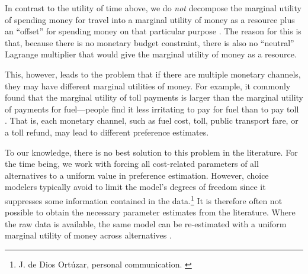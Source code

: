 In contrast to the utility of time above, we do \emph{not} decompose the  marginal utility of spending money for travel into a marginal utility of money as a resource plus an ``offset'' for spending money on that particular purpose \citep[for an example of this decomposition, see, e.g.][]{MunizagaEtAl2012TimeAllocationModeChoice}.  The reason for this is that, because there is no monetary budget constraint, there is also no ``neutral'' Lagrange multiplier that would give the marginal utility of money as a resource.

This, however, leads to the problem that if there are multiple monetary channels, they may have different marginal utilities of money.  For example, it commonly found that the marginal utility of toll payments is larger than the marginal utility of payments for fuel---\ie people find it less irritating to pay for fuel than to pay toll 
%
%
\citep[see, e.g.,][]{VrticEtc2008ReisekostenSVIBericht}.
%
That is, each monetary channel, such as fuel cost, toll, public transport fare, or a toll refund, may lead to different preference estimates.

To our knowledge, there is no best solution to this problem in the literature.  For the time being, we work with forcing all cost-related parameters of all alternatives to a uniform value in preference estimation.
%
However, choice modelers typically avoid to limit the model's degrees of freedom since it suppresses some information contained in the data.\footnote{%
%
J. de Dios Ort\'uzar, personal communication.
%
\label{fn:ortuzar-pers-com}}
%
It is therefore often not possible to obtain the necessary parameter estimates from the literature. Where the raw data is available, the same model can be re-estimated with a uniform marginal utility of money across alternatives
\citep[see, e.g.,][]{KickhoeferEtAl2011PolicyEvaluationIncome, TirachiniEtAl2012CrowdingCongestion}.

